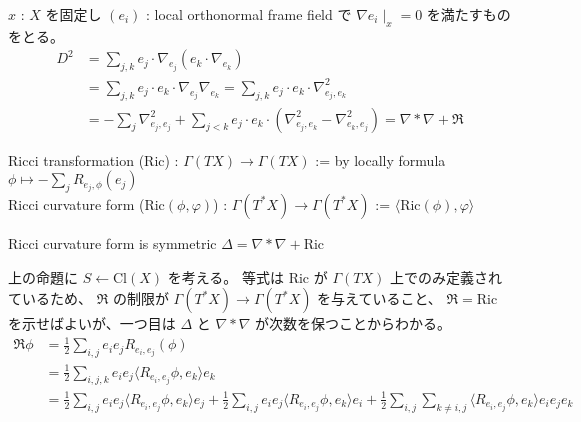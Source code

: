 \begin{Proof}
\itemprof
  \(x\) : \(X\) を固定し \((e_i)\) : local orthonormal frame field で \(\nabla e_i \mid_x = 0\) を満たすものをとる。
  \begin{align*}
    D^2
    &= \sum_{j,k} e_j \cdot \nabla_{e_j} (e_k \cdot \nabla_{e_k}) \\
    &= \sum_{j,k} e_j \cdot e_k \cdot \nabla_{e_j} \nabla_{e_k} = \sum_{j,k} e_j \cdot e_k \cdot \nabla_{e_j , e_k}^2 \\
    &= -\sum_j \nabla_{e_j , e_j}^2 + \sum_{j < k} e_j \cdot e_k \cdot (\nabla_{e_j , e_k}^2 - \nabla_{e_k , e_j}^2) = \nabla * \nabla + \mathfrak{R}
  \end{align*}
\end{Proof}

\begin{Definition}
\itemdefi
  \Define Ricci transformation (\(\text{Ric}\)) : \(\Gamma(TX) \to \Gamma(TX)\) := by locally formula \(\phi \mapsto - \sum_j R_{e_j , \phi}(e_j)\) \\
  \Define Ricci curvature form (\(\text{Ric}(\phi , \varphi)\)) : \(\Gamma(T^*X) \to \Gamma(T^*X)\) := \(\langle \text{Ric}(\phi) , \varphi \rangle\)
\end{Definition}

\begin{Theorem}
\itemprop
  Ricci curvature form is symmetric
\itemprop
  \(\Delta = \nabla * \nabla + \text{Ric}\)
\end{Theorem}

\begin{Proof}
\itemprof
  上の命題に \(S \leftarrow \text{Cl}(X)\) を考える。
  等式は \(\text{Ric}\) が \(\Gamma(TX)\) 上でのみ定義されているため、 \(\mathfrak{R}\) の制限が \(\Gamma(T^*X) \to \Gamma(T^*X)\) を与えていること、 \(\mathfrak{R} = \text{Ric}\) を示せばよいが、一つ目は \(\Delta\) と \(\nabla * \nabla\) が次数を保つことからわかる。
  \begin{align*}
    \mathfrak{R} \phi
    &= \frac{1}{2} \sum_{i,j} e_i e_j R_{e_i , e_j}(\phi) \\
    &= \frac{1}{2} \sum_{i,j,k} e_i e_j \langle R_{e_i , e_j} \phi , e_k \rangle e_k \\
    &= \frac{1}{2} \sum_{i,j} e_i e_j \langle R_{e_i , e_j} \phi , e_k \rangle e_j +
    \frac{1}{2} \sum_{i,j} e_i e_j \langle R_{e_i , e_j} \phi , e_k \rangle e_i +
    \frac{1}{2} \sum_{i,j} \sum_{k \not = i,j} \langle R_{e_i , e_j} \phi , e_k \rangle e_i e_j e_k
  \end{align*}
  \SORRY
\end{Proof}

